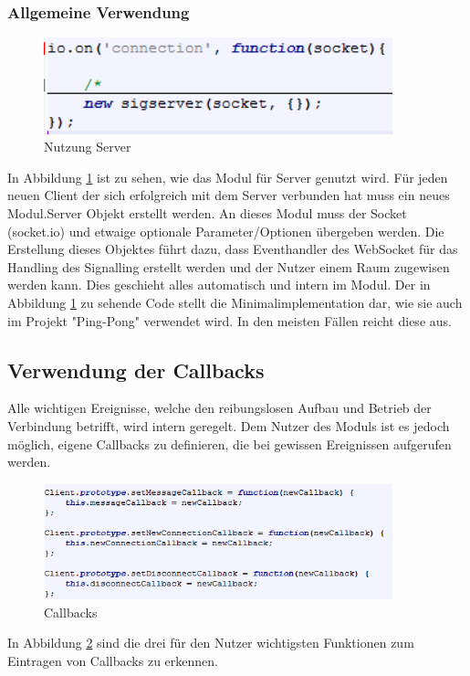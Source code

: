 \subsubsection{Allgemeine Verwendung} \label{serveruse}
\begin{figure}[htH]
\centering
\includegraphics[width=0.9\textwidth]{backend/Modul_UserServerHowTo.PNG}
\caption{Nutzung Server}
\label{backfig8}
\end{figure}
In Abbildung \ref{backfig8} ist zu sehen, wie das Modul für Server genutzt wird. Für jeden neuen Client der sich erfolgreich mit dem Server verbunden hat muss ein neues Modul.Server Objekt erstellt werden. An dieses Modul muss der Socket (socket.io) und etwaige optionale Parameter/Optionen übergeben werden. Die Erstellung dieses Objektes führt dazu, dass Eventhandler des WebSocket für das Handling des Signalling erstellt werden und der Nutzer einem Raum zugewisen werden kann. Dies geschieht alles automatisch und intern im Modul. Der in Abbildung \ref{backfig8} zu sehende Code stellt die Minimalimplementation dar, wie sie auch im Projekt "Ping-Pong" verwendet wird. In den meisten Fällen reicht diese aus.



\subsection{Verwendung der Callbacks} \label{callbacks}
Alle wichtigen Ereignisse, welche den reibungslosen Aufbau und Betrieb der Verbindung betrifft, wird intern geregelt. Dem Nutzer des Moduls ist es jedoch möglich, eigene Callbacks zu definieren, die bei gewissen Ereignissen aufgerufen werden.
\begin{figure}[htH]
\centering
\includegraphics[width=0.9\textwidth]{backend/Modul_Callbacks.PNG}
\caption{Callbacks}
\label{backfig9}
\end{figure}
In Abbildung \ref{backfig9} sind die drei für den Nutzer wichtigsten Funktionen zum Eintragen von Callbacks zu erkennen.

